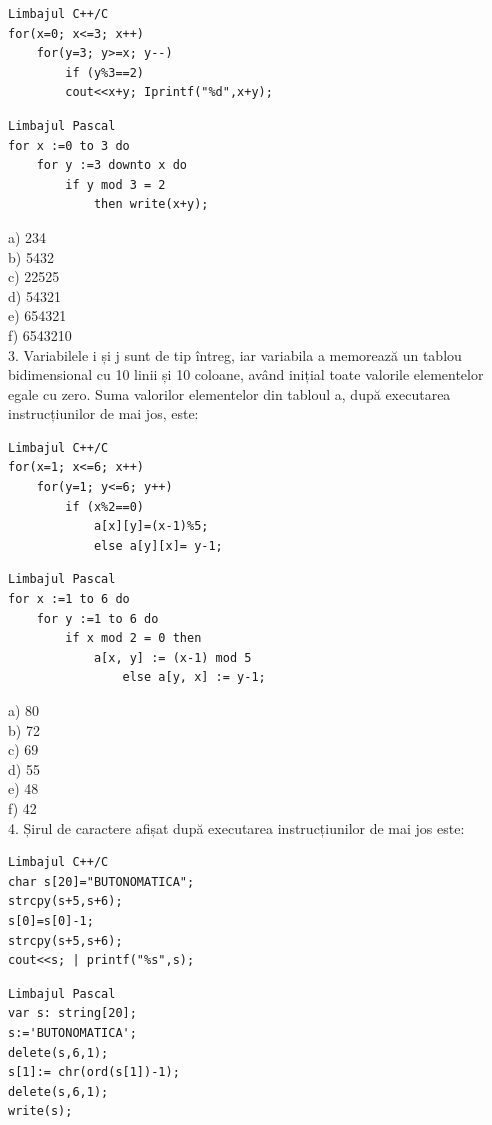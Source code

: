 \documentclass[10pt]{article}
\begin{document}
\begin{verbatim}
Limbajul C++/C
for(x=0; x<=3; x++)
    for(y=3; y>=x; y--)
        if (y%3==2)
        cout<<x+y; Iprintf("%d",x+y);
\end{verbatim}

\begin{verbatim}
Limbajul Pascal
for x :=0 to 3 do
    for y :=3 downto x do
        if y mod 3 = 2
            then write(x+y);
\end{verbatim}

a) 234\\
b) 5432\\
c) 22525\\
d) 54321\\
e) 654321\\
f) 6543210\\
3. Variabilele i și j sunt de tip întreg, iar variabila a memorează un tablou bidimensional cu 10 linii și 10 coloane, având inițial toate valorile elementelor egale cu zero. Suma valorilor elementelor din tabloul a, după executarea instrucțiunilor de mai jos, este:

\begin{verbatim}
Limbajul C++/C
for(x=1; x<=6; x++)
    for(y=1; y<=6; y++)
        if (x%2==0)
            a[x][y]=(x-1)%5;
            else a[y][x]= y-1;
\end{verbatim}

\begin{verbatim}
Limbajul Pascal
for x :=1 to 6 do
    for y :=1 to 6 do
        if x mod 2 = 0 then
            a[x, y] := (x-1) mod 5
                else a[y, x] := y-1;
\end{verbatim}

a) 80\\
b) 72\\
c) 69\\
d) 55\\
e) 48\\
f) 42\\
4. Șirul de caractere afișat după executarea instrucțiunilor de mai jos este:

\begin{verbatim}
Limbajul C++/C
char s[20]="BUTONOMATICA";
strcpy(s+5,s+6);
s[0]=s[0]-1;
strcpy(s+5,s+6);
cout<<s; | printf("%s",s);
\end{verbatim}

\begin{verbatim}
Limbajul Pascal
var s: string[20];
s:='BUTONOMATICA';
delete(s,6,1);
s[1]:= chr(ord(s[1])-1);
delete(s,6,1);
write(s);
\end{verbatim}
\end{document}
